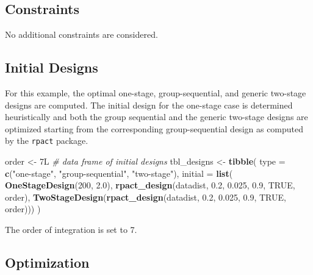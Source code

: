 \documentclass[
]{book}
\newenvironment{Shaded}{\begin{snugshade}}{\end{snugshade}}
\newcommand{\CommentTok}[1]{\textcolor[rgb]{0.56,0.35,0.01}{\textit{#1}}}
\newcommand{\DataTypeTok}[1]{\textcolor[rgb]{0.13,0.29,0.53}{#1}}
\newcommand{\DecValTok}[1]{\textcolor[rgb]{0.00,0.00,0.81}{#1}}
\newcommand{\FloatTok}[1]{\textcolor[rgb]{0.00,0.00,0.81}{#1}}
\newcommand{\KeywordTok}[1]{\textcolor[rgb]{0.13,0.29,0.53}{\textbf{#1}}}
\newcommand{\NormalTok}[1]{#1}
\newcommand{\OtherTok}[1]{\textcolor[rgb]{0.56,0.35,0.01}{#1}}
\newcommand{\StringTok}[1]{\textcolor[rgb]{0.31,0.60,0.02}{#1}}
\begin{document}
\hypertarget{constraints-14}{%
\subsection{Constraints}\label{constraints-14}}

No additional constraints are considered.

\hypertarget{initial-designs-1}{%
\subsection{Initial Designs}\label{initial-designs-1}}

For this example, the optimal one-stage, group-sequential, and generic
two-stage designs are computed.
The initial design for the one-stage case is determined heuristically
and both the group sequential and the generic two-stage designs are
optimized starting from the corresponding group-sequential design as
computed by the \texttt{rpact} package.

\begin{Shaded}
\begin{Highlighting}[]
\NormalTok{order \textless{}{-}}\StringTok{ }\NormalTok{7L}
\CommentTok{\# data frame of initial designs }
\NormalTok{tbl\_designs \textless{}{-}}\StringTok{ }\KeywordTok{tibble}\NormalTok{(}
    \DataTypeTok{type    =} \KeywordTok{c}\NormalTok{(}\StringTok{"one{-}stage"}\NormalTok{, }\StringTok{"group{-}sequential"}\NormalTok{, }\StringTok{"two{-}stage"}\NormalTok{),}
    \DataTypeTok{initial =} \KeywordTok{list}\NormalTok{(}
        \KeywordTok{OneStageDesign}\NormalTok{(}\DecValTok{200}\NormalTok{, }\FloatTok{2.0}\NormalTok{),}
        \KeywordTok{rpact\_design}\NormalTok{(datadist, }\FloatTok{0.2}\NormalTok{, }\FloatTok{0.025}\NormalTok{, }\FloatTok{0.9}\NormalTok{, }\OtherTok{TRUE}\NormalTok{, order),}
        \KeywordTok{TwoStageDesign}\NormalTok{(}\KeywordTok{rpact\_design}\NormalTok{(datadist, }\FloatTok{0.2}\NormalTok{, }\FloatTok{0.025}\NormalTok{, }\FloatTok{0.9}\NormalTok{, }\OtherTok{TRUE}\NormalTok{, order))) )}
\end{Highlighting}
\end{Shaded}

The order of integration is set to 7.

\hypertarget{optimization-13}{%
\subsection{Optimization}\label{optimization-13}}
\end{document}
